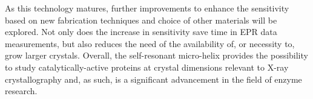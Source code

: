 As this technology matures, further improvements to enhance the sensitivity based on new fabrication techniques and choice of other materials will be explored. Not only does the increase in sensitivity save time in EPR data measurements, but also reduces the need of the availability of, or necessity to, grow larger crystals. Overall, the self-resonant micro-helix provides the possibility to study catalytically-active proteins at crystal dimensions relevant to X-ray crystallography and, as such, is a significant advancement in the field of enzyme research. 

{\renewcommand{\bibsection}{\clearpage\section*{\bibname}\markboth{\bibname}{\bibname}}
\renewcommand{\bibname}{CHAPTER 5. REFERENCES}


}
